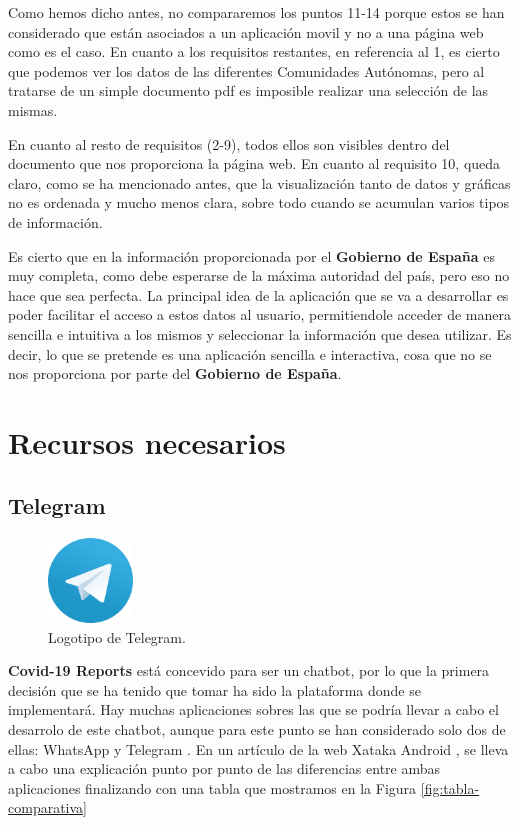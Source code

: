 Como hemos dicho antes, no compararemos los puntos 11-14 porque estos se han considerado que están asociados a un aplicación movil y no a una página web como es el caso. En cuanto a los requisitos restantes, en referencia al 1, es cierto que podemos ver los datos de las diferentes Comunidades Autónomas, pero al tratarse de un simple documento pdf es imposible realizar una selección de las mismas.

En cuanto al resto de requisitos (2-9), todos ellos son visibles dentro del documento que nos proporciona la página web. En cuanto al requisito 10, queda claro, como se ha mencionado antes, que la visualización tanto de datos y gráficas no es ordenada y mucho menos clara, sobre todo cuando se acumulan varios tipos de información.

Es cierto que en la información proporcionada por el \textbf{Gobierno de España} es muy completa, como debe esperarse de la máxima autoridad del país, pero eso no hace que sea perfecta. La principal idea de la aplicación que se va a desarrollar es poder facilitar el acceso a estos datos al usuario, permitiendole acceder de manera sencilla e intuitiva a los mismos y seleccionar la información que desea utilizar. Es decir, lo que se pretende es una aplicación sencilla e interactiva, cosa que no se nos proporciona por parte del \textbf{Gobierno de España}.

\section{Recursos necesarios}

\subsection{Telegram}

\begin{figure}[H]
	\centering
	\includegraphics[width=0.2\textwidth]{img/telegram-icon}
	\caption{Logotipo de Telegram.}
\end{figure}

\textbf{Covid-19 Reports} está concevido para ser un chatbot, por lo que la primera decisión que se ha tenido que tomar ha sido la plataforma donde se implementará. Hay muchas aplicaciones sobres las que se podría llevar a cabo el desarrolo de este chatbot, aunque para este punto se han considerado solo dos de ellas: WhatsApp \cite{whatsapp} y Telegram \cite{telegram}. En un artículo de la web Xataka Android \cite{articulo-xataka}, se lleva a cabo una explicación punto por punto de las diferencias entre ambas aplicaciones finalizando con una tabla que mostramos en la Figura \ref{fig:tabla-comparativa}

